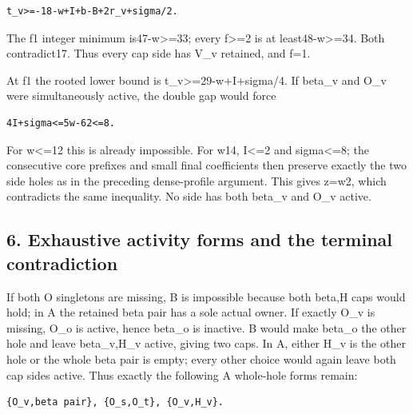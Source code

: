 \documentclass[10pt,a4paper]{article}
\theoremstyle{definition}
\begin{document}
\begin{lstlisting}
t_v>=-18-w+I+b-B+2r_v+sigma/2.
\end{lstlisting}

The f1 integer minimum is47-w\textgreater=\allowbreak{}33; every f\textgreater=\allowbreak{}2 is
at least48-w\textgreater=\allowbreak{}34. Both contradict17. Thus every cap side has
V\_\allowbreak{}v retained,\allowbreak{} and f=\allowbreak{}1.

At f1 the rooted lower bound is t\_\allowbreak{}v\textgreater=\allowbreak{}29-w+\allowbreak{}I+\allowbreak{}sigma/4. If
beta\_\allowbreak{}v and O\_\allowbreak{}v were simultaneously active,\allowbreak{} the double gap would force

\begin{lstlisting}
4I+sigma<=5w-62<=8.
\end{lstlisting}

For w\textless=\allowbreak{}12 this is already impossible. For w14,\allowbreak{} I\textless=\allowbreak{}2 and
sigma\textless=\allowbreak{}8; the consecutive core prefixes and small final
coefficients then preserve exactly the two side holes as in the
preceding dense-profile argument. This gives z=\allowbreak{}w2,\allowbreak{} which contradicts the
same inequality. No side has both beta\_\allowbreak{}v and O\_\allowbreak{}v active.

\hypertarget{exhaustive-activity-forms-and-the-terminal-contradiction}{%
\subsection{6. Exhaustive activity forms and the terminal
contradiction}\label{exhaustive-activity-forms-and-the-terminal-contradiction}}

If both O singletons are missing,\allowbreak{} B is impossible because both beta,\allowbreak{}H
caps would hold; in A the retained beta pair has a sole actual owner. If
exactly O\_\allowbreak{}v is missing,\allowbreak{} O\_\allowbreak{}o is active,\allowbreak{} hence beta\_\allowbreak{}o is inactive. B
would make beta\_\allowbreak{}o the other hole and leave beta\_\allowbreak{}v,\allowbreak{}H\_\allowbreak{}v active,\allowbreak{} giving
two caps. In A,\allowbreak{} either H\_\allowbreak{}v is the other hole or the whole beta pair is
empty; every other choice would again leave both cap sides active. Thus
exactly the following A whole-hole forms remain:

\begin{lstlisting}
{O_v,beta pair}, {O_s,O_t}, {O_v,H_v}.
\end{lstlisting}
\end{document}
